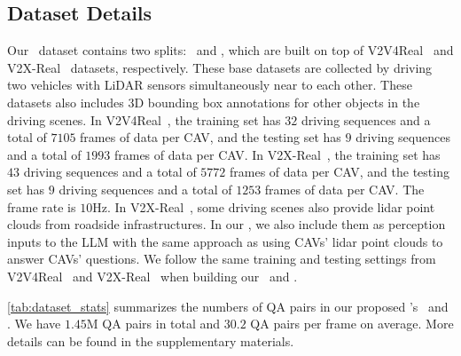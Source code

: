 \subsection{Dataset Details}
Our \namedataset~dataset contains two splits: \textbf{\namevsplit}~and \textbf{\namexsplit}, which are built on top of V2V4Real~\cite{xu2023v2v4real} and V2X-Real~\cite{xiang2024v2xreal} datasets, respectively. These base datasets are collected by driving two vehicles with LiDAR sensors simultaneously near to each other.
These datasets also includes 3D bounding box annotations for other objects in the driving scenes. In V2V4Real~\cite{xu2023v2v4real}, the training set has $32$ driving sequences and a total of $7105$ frames of data per CAV, and the testing set has $9$ driving sequences and a total of $1993$ frames of data per CAV. In V2X-Real~\cite{xiang2024v2xreal}, the training set has $43$ driving sequences and a total of $5772$ frames of data per CAV, and the testing set has $9$ driving sequences and a total of $1253$ frames of data per CAV. The frame rate is $10$Hz. In V2X-Real~\cite{xiang2024v2xreal}, some driving scenes also provide lidar point clouds from roadside infrastructures. In our \namexsplit, we also include them as perception inputs to the LLM with the same approach as using CAVs' lidar point clouds to answer CAVs' questions. We follow the same training and testing settings from V2V4Real~\cite{xu2023v2v4real} and V2X-Real~\cite{xiang2024v2xreal} when building our \namevsplit~and \namexsplit.

\cref{tab:dataset_stats} summarizes the numbers of QA pairs in our proposed \namedataset's \namevsplit~and \namexsplit. We have $1.45$M QA pairs in total and $30.2$ QA pairs per frame on average. More details can be found in the supplementary materials.
 
